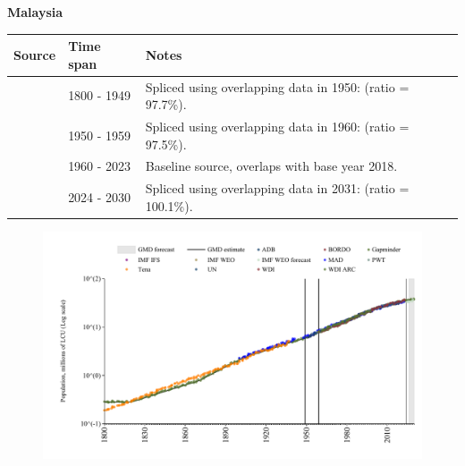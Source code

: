 \documentclass[12pt,a4paper,landscape]{article}
\begin{document}
\begin{adjustbox}{max totalsize={\paperwidth}{\paperheight},center}
\begin{minipage}[t][\textheight][t]{\textwidth}
\vspace*{0.5cm}
{}
\begin{center}
{\Large\bfseries Malaysia}
\end{center}
\vspace{0.5cm}
\begin{table}[H]
\centering
\small
\begin{tabular}{|l|l|l|}
\hline
\textbf{Source} & \textbf{Time span} & \textbf{Notes} \\
\hline
\rowcolor{white}\cite{Gapminder}& 1800 - 1949 &Spliced using overlapping data in 1950: (ratio = 97.7\%).\\
\rowcolor{lightgray}\cite{IMF_IFS}& 1950 - 1959 &Spliced using overlapping data in 1960: (ratio = 97.5\%).\\
\rowcolor{white}\cite{WDI}& 1960 - 2023 &Baseline source, overlaps with base year 2018.\\
\rowcolor{lightgray}\cite{Gapminder}& 2024 - 2030 &Spliced using overlapping data in 2031: (ratio = 100.1\%).\\
\hline
\end{tabular}
\end{table}
\begin{figure}[H]
\centering
\includegraphics[width=\textwidth,height=0.6\textheight,keepaspectratio]{graphs/MYS_pop.pdf}
\end{figure}
\end{minipage}
\end{adjustbox}
\end{document}
